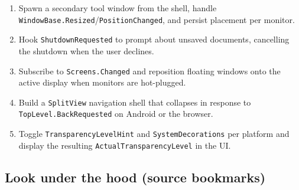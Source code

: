 \begin{enumerate}
\def\labelenumi{\arabic{enumi}.}
\tightlist
\item
  Spawn a secondary tool window from the shell, handle
  \passthrough{\lstinline!WindowBase.Resized!}/\passthrough{\lstinline!PositionChanged!},
  and persist placement per monitor.
\item
  Hook \passthrough{\lstinline!ShutdownRequested!} to prompt about
  unsaved documents, cancelling the shutdown when the user declines.
\item
  Subscribe to \passthrough{\lstinline!Screens.Changed!} and reposition
  floating windows onto the active display when monitors are
  hot-plugged.
\item
  Build a \passthrough{\lstinline!SplitView!} navigation shell that
  collapses in response to
  \passthrough{\lstinline!TopLevel.BackRequested!} on Android or the
  browser.
\item
  Toggle \passthrough{\lstinline!TransparencyLevelHint!} and
  \passthrough{\lstinline!SystemDecorations!} per platform and display
  the resulting \passthrough{\lstinline!ActualTransparencyLevel!} in the
  UI.
\end{enumerate}

\subsection{Look under the hood (source
bookmarks)}\label{look-under-the-hood-source-bookmarks-10}

